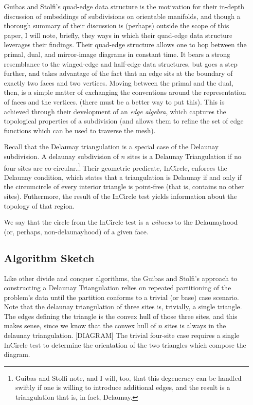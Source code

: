 \documentclass[12pt,twoside]{reedthesis}
\begin{document}
  Guibas and Stolfi's quad-edge data structure is the motivation for their in-depth discussion of embeddings of subdivisions on orientable manifolds, and though a thorough summary of their discussion is (perhaps) outside the scope of this paper, I will note, briefly, they ways in which their quad-edge data structure leverages their findings. Their quad-edge structure allows one to hop between the primal, dual, and mirror-image diagrams in constant time. It bears a strong resemblance to the winged-edge and half-edge data structures, but goes a step further, and takes advantage of the fact that an edge sits at the boundary of exactly two faces and two vertices. Moving between the primal and the dual, then, is a simple matter of exchanging the conventions around the representation of faces and the vertices. (there must be a better way to put this). This is achieved through their development of an \emph{edge algebra}, which captures the topological properties of a subdivision (and allows them to refine the set of edge functions which can be used to traverse the mesh). 

  Recall that the Delaunay triangulation is a special case of the Delaunay subdivision. A delaunay subdivision of $n$ sites is a Delaunay Triangulation if no four sites are co-circular.\footnote{Guibas and Stolfi note, and I will, too, that this degeneracy can be handled swiftly if one is willing to introduce additional edges, and the result is a triangulation that is, in fact, Delaunay.} Their geometric predicate, InCircle, enforces the Delaunay condition, which states that a triangulation is Delaunay if and only if the circumcircle of every interior triangle is point-free (that is, contains no other sites). Futhermore, the result of the InCircle test yields information about the topology of that region. \par

  We say that the circle from the InCircle test is a \emph{witness} to the Delaunayhood (or, perhaps, non-delaunayhood) of a given face. \par

  \subsection{Algorithm Sketch}
  \label{sub:Algortithm Sketch}
  Like other divide and conquer algorithms, the Guibas and Stolfi's approach to constructing a Delaunay Triangulation relies on repeated partitioning of the problem's data until the partition conforms to a trivial (or base) case scenario. Note that the delaunay triangulation of three sites is, trivially, a single triangle. The edges defining the triangle is the convex hull of those three sites, and this makes sense, since we know that the convex hull of $n$ sites is always in the delaunay triangulation. [DIAGRAM] The trivial four-site case requires a single InCircle test to determine the orientation of the two triangles which compose the diagram.\par
\end{document}

